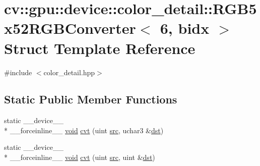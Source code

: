 \hypertarget{structcv_1_1gpu_1_1device_1_1color__detail_1_1RGB5x52RGBConverter_3_016_00_01bidx_01_4}{\section{cv\-:\-:gpu\-:\-:device\-:\-:color\-\_\-detail\-:\-:R\-G\-B5x52\-R\-G\-B\-Converter$<$ 6, bidx $>$ Struct Template Reference}
\label{structcv_1_1gpu_1_1device_1_1color__detail_1_1RGB5x52RGBConverter_3_016_00_01bidx_01_4}
}


{\ttfamily \#include $<$color\-\_\-detail.\-hpp$>$}

\subsection*{Static Public Member Functions}
\begin{DoxyCompactItemize}
\item 
static \-\_\-\-\_\-device\-\_\-\-\_\- \\*
\-\_\-\-\_\-forceinline\-\_\-\-\_\- \hyperlink{legacy_8hpp_a8bb47f092d473522721002c86c13b94e}{void} \hyperlink{structcv_1_1gpu_1_1device_1_1color__detail_1_1RGB5x52RGBConverter_3_016_00_01bidx_01_4_a08b7d4931798c195139c528d21a8e51c}{cvt} (uint \hyperlink{legacy_8hpp_a371cd109b74033bc4366f584edd3dacc}{src}, uchar3 \&\hyperlink{photo__c_8h_aed13e2a25279b24dc954073233fef7a5}{dst})
\item 
static \-\_\-\-\_\-device\-\_\-\-\_\- \\*
\-\_\-\-\_\-forceinline\-\_\-\-\_\- \hyperlink{legacy_8hpp_a8bb47f092d473522721002c86c13b94e}{void} \hyperlink{structcv_1_1gpu_1_1device_1_1color__detail_1_1RGB5x52RGBConverter_3_016_00_01bidx_01_4_a8a0d9734c8c458870ae18c455dbd0765}{cvt} (uint \hyperlink{legacy_8hpp_a371cd109b74033bc4366f584edd3dacc}{src}, uint \&\hyperlink{photo__c_8h_aed13e2a25279b24dc954073233fef7a5}{dst})
\end{DoxyCompactItemize}


